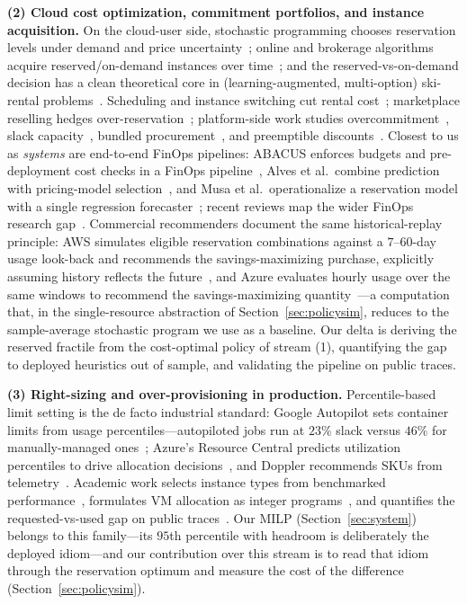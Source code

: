 \documentclass[10pt,journal]{IEEEtran}
\begin{document}
\textbf{(2) Cloud cost optimization, commitment portfolios, and instance
acquisition.}
On the cloud-user side, stochastic programming chooses reservation levels
under demand and price
uncertainty~\cite{chaisiri2012provisioning,bulbul2021provisioning}; online
and brokerage algorithms acquire reserved/on-demand instances over
time~\cite{wang2014optimal,mandal2023reservation}; and the
reserved-vs-on-demand decision
has a clean theoretical core in (learning-augmented, multi-option) ski-rental
problems~\cite{shin2023skirental,zhang2024skirental}.
Scheduling and instance switching cut rental
cost~\cite{hosseini2020switch}; marketplace reselling hedges
over-reservation~\cite{ambati2020reservations}; platform-side
work studies overcommitment~\cite{cohen2019overcommitment}, slack
capacity~\cite{nunez2021slack}, bundled procurement~\cite{arbabian2021capacity},
and preemptible discounts~\cite{chen2021discount,chen2019pricing}. Closest to
us as \emph{systems} are end-to-end FinOps pipelines: ABACUS enforces
budgets and pre-deployment cost checks in a FinOps
pipeline~\cite{deochake2024abacus}, Alves et al.~combine prediction with
pricing-model selection~\cite{alves2025iaas}, and Musa et
al.~operationalize a reservation model with a single regression
forecaster~\cite{musa2024costeffective}; recent reviews map the wider
FinOps research gap~\cite{anjum2026finops}. Commercial recommenders
document the same historical-replay principle: AWS simulates eligible
reservation combinations against a $7$--$60$-day usage look-back and
recommends the savings-maximizing purchase, explicitly assuming history
reflects the future~\cite{awsri2026,awssp2026}, and Azure evaluates hourly
usage over the same windows to recommend the savings-maximizing
quantity~\cite{azureres2026}---a computation that, in the single-resource
abstraction of Section~\ref{sec:policysim}, reduces to the sample-average
stochastic program we use as a baseline. Our delta is deriving the reserved
fractile from the cost-optimal policy of stream (1), quantifying the gap to
deployed heuristics out of sample, and validating the pipeline on public
traces.

\textbf{(3) Right-sizing and over-provisioning in production.}
Percentile-based limit setting is the de facto industrial standard: Google
Autopilot sets container limits from usage percentiles---autopiloted jobs
run at $23\%$ slack versus $46\%$ for manually-managed
ones~\cite{rzadca2020autopilot}; Azure's Resource
Central predicts utilization percentiles to drive allocation
decisions~\cite{cortez2017resource}, and Doppler recommends SKUs from
telemetry~\cite{cahoon2022doppler}. Academic work
selects instance types from benchmarked performance~\cite{yadwadkar2017paris},
formulates VM allocation as integer
programs~\cite{aydin2020binpacking}, and quantifies the
requested-vs-used gap on public
traces~\cite{lu2017imbalance,guo2019alibaba,reidys2025coach,uhlig2025sap}.
Our MILP (Section~\ref{sec:system}) belongs to this family---its $95$th
percentile with headroom is deliberately the deployed idiom---and our
contribution over this stream is to read that idiom through the reservation
optimum and measure the cost of the difference (Section~\ref{sec:policysim}).
\end{document}
